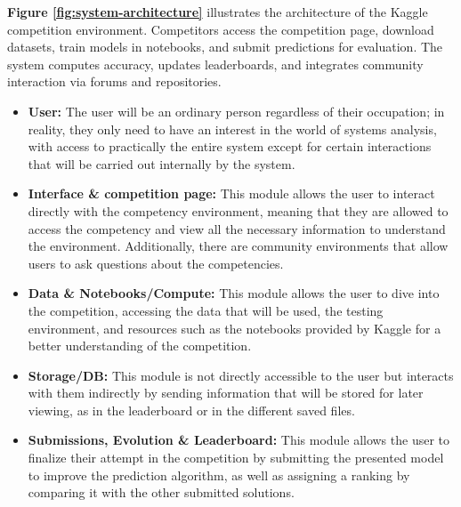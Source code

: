 \documentclass[12pt]{report}
\begin{document}
\noindent
\textbf{Figure \ref{fig:system-architecture}} illustrates the architecture of the Kaggle competition environment. Competitors access the competition page, download datasets, train models in notebooks, and submit predictions for evaluation. The system computes accuracy, updates leaderboards, and integrates community interaction via forums and repositories.
\begin{itemize}
    \item \textbf{User:} The user will be an ordinary person regardless of their occupation; in reality, they only need to have an interest in the world of systems analysis, with access to practically the entire system except for certain interactions that will be carried out internally by the system.
    \item \textbf{Interface \& competition page:} This module allows the user to interact directly with the competency environment, meaning that they are allowed to access the competency and view all the necessary information to understand the environment. Additionally, there are community environments that allow users to ask questions about the competencies.
    \item \textbf{Data \& Notebooks/Compute:} This module allows the user to dive into the competition, accessing the data that will be used, the testing environment, and resources such as the notebooks provided by Kaggle for a better understanding of the competition.
    \item \textbf{Storage/DB:} This module is not directly accessible to the user but interacts with them indirectly by sending information that will be stored for later viewing, as in the leaderboard or in the different saved files.
    \item \textbf{Submissions, Evolution \& Leaderboard:} This module allows the user to finalize their attempt in the competition by submitting the presented model to improve the prediction algorithm, as well as assigning a ranking by comparing it with the other submitted solutions.
\end{itemize}
\end{document}
